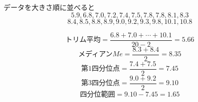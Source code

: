 
データを大きさ順に並べると
\begin{equation*}
  5.9, 6.8, 7.0, 7.2, 7.4, 7.5, 7.8, 7.8, 8.1, 8.3
\end{equation*}
\begin{equation*}
  8.4, 8.5, 8.8, 8.9, 9.0, 9.2, 9.3, 9.8, 10.1, 10.8
\end{equation*}

\begin{equation*}
  \text{トリム平均} = \frac{6.8 + 7.0 + \cdots + 10.1}{20 - 2} = 5.66
\end{equation*}
\begin{equation*}
\text{メディアン}Me = \frac{8.3 + 8.4}{2} = 8.35
\end{equation*}
\begin{equation*}
  \text{第1四分位点} = \frac{7.4 + 7.5}{2} = 7.45
\end{equation*}
\begin{equation*}
  \text{第3四分位点} = \frac{9.0 + 9.2}{2} = 9.10
\end{equation*}
\begin{equation*}
  \text{四分位範囲} = 9.10 - 7.45 = 1.65
\end{equation*}
